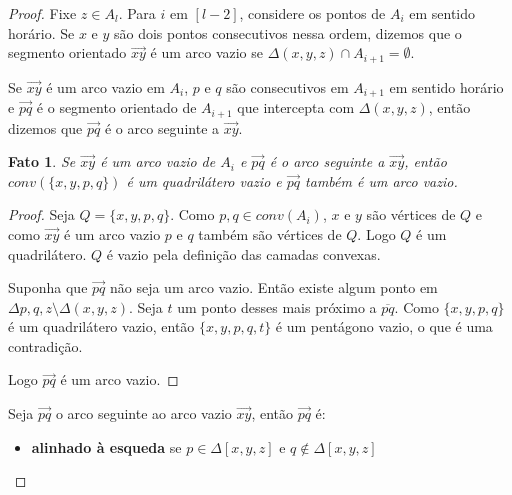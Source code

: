 \documentclass[a4paper]{book}
\newtheorem{fato}{Fato}
\begin{document}
\begin{proof}
    Fixe $z\in A_l$. Para $i$ em $[l-2]$, considere os pontos de $A_i$ em sentido horário. Se $x$ e $y$ são dois pontos consecutivos nessa ordem, dizemos que o segmento orientado $\overrightarrow{xy}$ é um arco vazio se $\Delta (x,y,z)\cap A_{i+1}=\emptyset$.

    Se $\overrightarrow{xy}$ é um arco vazio em $A_i$, $p$ e $q$ são consecutivos em $A_{i+1}$ em sentido horário e $\overrightarrow{pq}$ é o segmento orientado de $A_{i+1}$ que intercepta com $\Delta(x,y,z)$, então dizemos que $\overrightarrow{pq}$ é o arco seguinte a $\overrightarrow{xy}$.


    \begin{fato}\label{fato1}
        Se $\overrightarrow{xy}$ é um arco vazio de $A_i$ e $\overrightarrow{pq}$ é o arco seguinte a $\overrightarrow{xy}$, então $conv(\{x,y,p,q\})$ é um quadrilátero vazio e $\overrightarrow{pq}$ também é um arco vazio.
    \end{fato}
    \begin{proof}
        Seja $Q=\{x,y,p,q\}$. Como $p,q\in conv(A_i)$, $x$ e $y$ são vértices de $Q$ e como $\overrightarrow{xy}$ é um arco vazio $p$ e $q$ também são vértices de $Q$. Logo $Q$ é um quadrilátero. $Q$ é vazio pela definição das camadas convexas.

        Suponha que $\overrightarrow{pq}$ não seja um arco vazio. Então existe algum ponto em $\Delta{p,q,z}\setminus\Delta(x,y,z)$. Seja $t$ um ponto desses mais próximo a $\overline{pq}$. Como $\{x,y,p,q\}$ é um quadrilátero vazio, então $\{x,y,p,q,t\}$ é um pentágono vazio, o que é uma contradição.

        Logo $\overrightarrow{pq}$ é um arco vazio.
    \end{proof}

    Seja $\overrightarrow{pq}$ o arco seguinte ao arco vazio $\overrightarrow{xy}$, então $\overrightarrow{pq}$ é:
    \begin{itemize}
        \item \textbf{alinhado à esqueda} se $p\in\Delta[x,y,z]$ e $q\notin\Delta[x,y,z]$


\end{itemize}
\end{proof}
\end{document}
